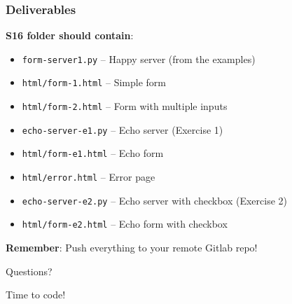 \documentclass[xcolor=table]{beamer}
\begin{document}
\begin{frame}
\frametitle{Deliverables}

\textbf{S16 folder should contain}:

\vspace{0.2cm}

\begingroup\small
\begin{itemize}
\item \texttt{form-server1.py} -- Happy server (from the examples)
\item \texttt{html/form-1.html} -- Simple form
\item \texttt{html/form-2.html} -- Form with multiple inputs
\item \texttt{echo-server-e1.py} -- Echo server (Exercise 1)
\item \texttt{html/form-e1.html} -- Echo form
\item \texttt{html/error.html} -- Error page
\item \texttt{echo-server-e2.py} -- Echo server with checkbox (Exercise 2)
\item \texttt{html/form-e2.html} -- Echo form with checkbox
\end{itemize}
\endgroup

\vspace{0.3cm}

\textbf{Remember}: Push everything to your remote Gitlab repo!

\end{frame}


\begin{frame}
\begin{center}
\Huge{Questions?}

\vspace{1cm}

\Large{Time to code!}
\end{center}
\end{frame}
\end{document}
